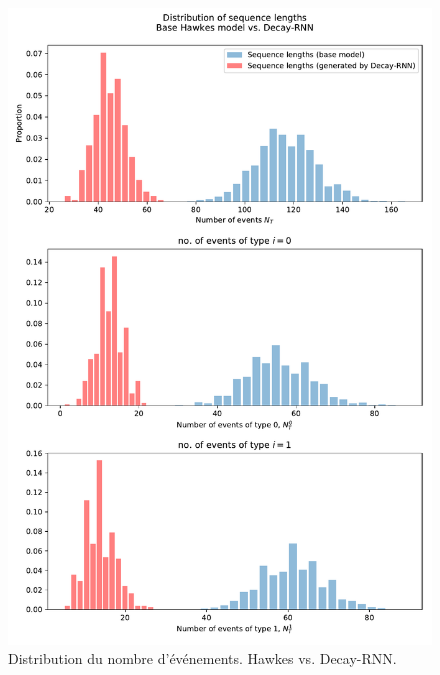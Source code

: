 \documentclass[11pt]{article}
\begin{document}
\begin{figure}[h]
	\includegraphics[width=\linewidth]{../results/seq_length_distrib_Decay-RNN.pdf}
	\caption{Distribution du nombre d'événements. Hawkes vs. Decay-RNN.}\label{fig:hawkesDecayRNNlengthDistrib}
\end{figure}


\printbibliography

\begin{appendices}
	


\end{appendices}
\end{document}
